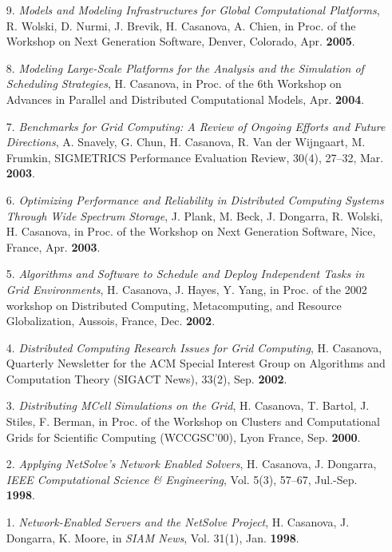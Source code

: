 
\begin{enumerate}

\item [9.]
{\it Models and Modeling Infrastructures for Global Computational
Platforms}, R. Wolski, D. Nurmi, J. Brevik, H. Casanova, A. Chien, in
Proc. of the Workshop on Next Generation Software, Denver, Colorado,
Apr. {\bf 2005}.

\item [8.]
{\it Modeling Large-Scale Platforms for the Analysis and
the Simulation of Scheduling Strategies}, H. Casanova, in 
Proc. of the 6th Workshop on Advances in Parallel and
Distributed Computational Models, Apr. {\bf 2004}.

\item [7.]
{\it Benchmarks for Grid Computing: A Review of Ongoing Efforts and Future
Directions}, A. Snavely, G. Chun, H. Casanova, R. Van der Wijngaart,
M. Frumkin, SIGMETRICS Performance Evaluation Review, 30(4), 27--32, Mar.
{\bf 2003}.

\item [6.]
{\it Optimizing Performance and Reliability in Distributed Computing
Systems Through Wide Spectrum Storage}, J. Plank, M. Beck, J. Dongarra,
R. Wolski, H. Casanova, in Proc. of the Workshop on Next Generation
Software, Nice, France, Apr. {\bf 2003}.

\item[5.]
{\it Algorithms and Software to Schedule and Deploy Independent Tasks
in Grid Environments}, H. Casanova, J. Hayes, Y. Yang, in Proc. of
the 2002 workshop on Distributed Computing, Metacomputing, and Resource
Globalization, Aussois, France, Dec. {\bf 2002}.

\item [4.] {\it Distributed Computing Research Issues for Grid Computing},
H. Casanova, Quarterly Newsletter for the ACM Special Interest Group on
Algorithms and Computation Theory (SIGACT News), 33(2), Sep. {\bf 2002}.


\item[3.]
{\it Distributing MCell Simulations on the Grid}, H. Casanova, T. Bartol,
J. Stiles, F. Berman, in Proc. of the Workshop on Clusters and
Computational Grids for Scientific Computing (WCCGSC'00), Lyon France,
Sep. {\bf 2000}.

\item[2.]
{\it Applying NetSolve's Network Enabled Solvers}, H. Casanova,
J. Dongarra, {\em IEEE Computational Science \& Engineering}, Vol. 5(3),
57--67, Jul.-Sep. {\bf 1998}.

\item[1.]
{\it Network-Enabled Servers and the NetSolve Project}, H. Casanova,
J. Dongarra, K. Moore, in \emph{SIAM News}, Vol. 31(1), Jan.
{\bf 1998}.


\end{enumerate}


